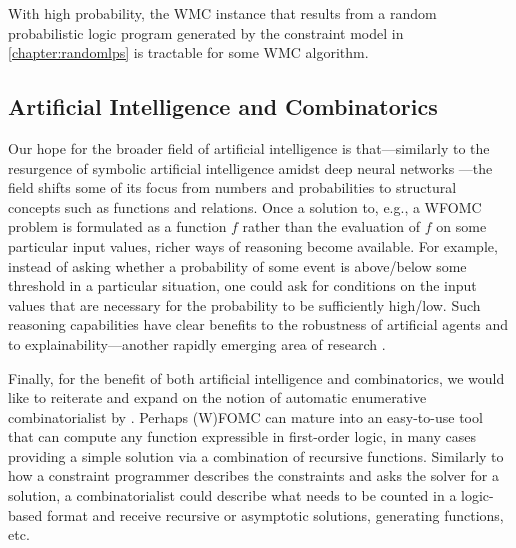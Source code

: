 \begin{conjecture}
  With high probability, the WMC instance that results from a random
  probabilistic logic program generated by the constraint model in
  \cref{chapter:randomlps} is tractable for some WMC algorithm.
\end{conjecture}


\subsection{Artificial Intelligence and Combinatorics}

Our hope for the broader field of artificial intelligence is that---similarly to
the resurgence of symbolic artificial intelligence amidst deep neural networks
\citep{garnelo2019reconciling}---the field shifts some of its focus from numbers
and probabilities to structural concepts such as functions and relations. Once a
solution to, e.g., a WFOMC problem is formulated as a function $f$ rather than
the evaluation of $f$ on some particular input values, richer ways of reasoning
become available. For example, instead of asking whether a probability of some
event is above/below some threshold in a particular situation, one could ask for
conditions on the input values that are necessary for the probability to be
sufficiently high/low. Such reasoning capabilities have clear benefits to the
robustness of artificial agents and to explainability---another rapidly emerging
area of research
\citep{DBLP:journals/corr/abs-1909-03012,DBLP:journals/fdata/BelleP21,DBLP:journals/corr/abs-2202-10335}.

Finally, for the benefit of both artificial intelligence and combinatorics, we
would like to reiterate and expand on the notion of automatic enumerative
combinatorialist by \citet{DBLP:conf/ilp/BarvinekB0ZK21}. Perhaps (W)FOMC can
mature into an easy-to-use tool that can compute any function expressible in
first-order logic, in many cases providing a simple solution via a combination
of recursive functions. Similarly to how a constraint programmer describes the
constraints and asks the solver for a solution, a combinatorialist could
describe what needs to be counted in a logic-based format and receive recursive
or asymptotic solutions, generating functions, etc.

